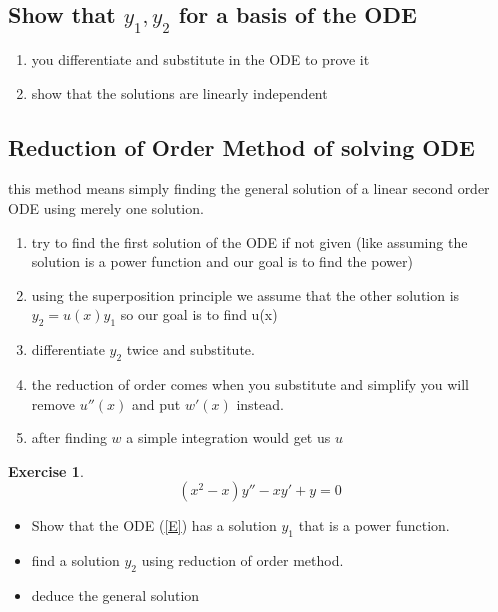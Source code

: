 \documentclass[11pt]{article}
\theoremstyle{definition}
\newtheorem{exer}{Exercise}
\begin{document}
\subsection{Show that $y_1,y_2$ for a basis of the ODE}
\begin{enumerate}
    \item you differentiate and substitute in the ODE to prove it
    \item show that the solutions are linearly independent 
\end{enumerate}
\subsection{Reduction of Order Method of solving ODE}
this method means simply finding the general solution of a linear second order ODE using merely one solution.
\begin{enumerate}
    \item try to find the first solution of the ODE if not given (like assuming the solution is a power function and our goal is to find the power)
    \item using the superposition principle we assume that the other solution is $y_2 = u(x) y_1$ so our goal is to find u(x)
    \item differentiate $y_2$ twice and substitute.
    \item the reduction of order comes when you substitute and simplify you will remove $u''(x)$ and put $w'(x)$ instead.
    \item after finding $w$ a simple integration would get us $u$
\end{enumerate}
\begin{exer}
\begin{equation}
\label{E}
    (x^2 - x)y'' -  xy' + y = 0
\end{equation}
\begin{itemize}
    \item Show that the ODE (\ref{E}) has a solution $y_1$ that is a power function.
\item find a solution $y_2$ using reduction of order method.
\item deduce the general solution
\end{itemize}
\end{exer}
\end{document}
